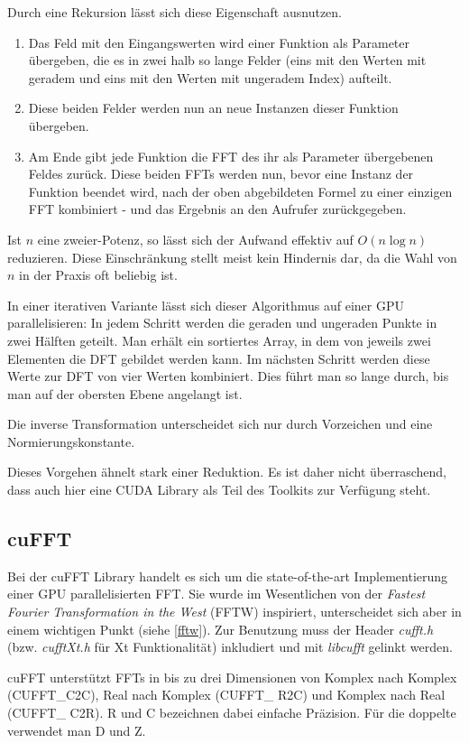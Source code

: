 		Durch eine Rekursion lässt sich diese Eigenschaft ausnutzen.
		\begin{enumerate}
		    \item Das Feld mit den Eingangswerten wird einer Funktion als Parameter übergeben, die es in zwei halb so lange Felder (eins mit den Werten mit geradem und eins mit den Werten mit ungeradem Index) aufteilt.
			\item Diese beiden Felder werden nun an neue Instanzen dieser Funktion übergeben.
			\item Am Ende gibt jede Funktion die FFT des ihr als Parameter übergebenen Feldes zurück. Diese beiden FFTs werden nun, bevor eine Instanz der Funktion beendet wird, nach der oben abgebildeten Formel zu einer einzigen FFT kombiniert - und das Ergebnis an den Aufrufer zurückgegeben.
		\end{enumerate}
		Ist $n$ eine zweier-Potenz, so lässt sich der Aufwand effektiv auf $O(n\log n)$ reduzieren. Diese Einschränkung stellt meist kein Hindernis dar, da die Wahl von $n$ in der Praxis oft beliebig ist.
		
		In einer iterativen Variante lässt sich dieser Algorithmus auf einer GPU parallelisieren: In jedem Schritt werden die geraden und ungeraden Punkte in zwei Hälften geteilt. Man erhält ein sortiertes Array, in dem von jeweils zwei Elementen die DFT gebildet werden kann. Im nächsten Schritt werden diese Werte zur DFT von vier Werten kombiniert. Dies führt man so lange durch, bis man auf der obersten Ebene angelangt ist. 
		
		Die inverse Transformation unterscheidet sich nur durch Vorzeichen und eine Normierungskonstante.
		
		Dieses Vorgehen ähnelt stark einer Reduktion. Es ist daher nicht überraschend, dass auch hier eine CUDA Library als Teil des Toolkits zur Verfügung steht.
		
		\subsection{cuFFT}
		Bei der cuFFT Library handelt es sich um die state-of-the-art Implementierung einer GPU parallelisierten FFT. Sie wurde im Wesentlichen von der \textit{Fastest Fourier Transformation in the West} (FFTW) inspiriert, unterscheidet sich aber in einem wichtigen Punkt (siehe \ref{fftw}). Zur Benutzung muss der Header \textit{cufft.h} (bzw. \textit{cufftXt.h} für Xt Funktionalität) inkludiert und mit \textit{libcufft} gelinkt werden.
		
		cuFFT unterstützt FFTs in bis zu drei Dimensionen von Komplex nach Komplex (CUFFT{\_}C2C), Real nach Komplex (CUFFT\_ R2C) und Komplex nach Real (CUFFT\_ C2R). R und C bezeichnen dabei einfache Präzision. Für die doppelte verwendet man D und Z.
	
